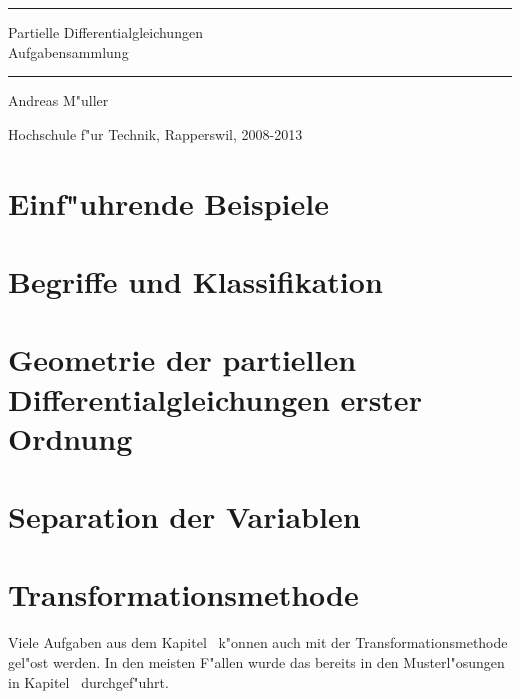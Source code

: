 \documentclass[a4paper,12pt]{book}
\begin{document}
\pagestyle{fancy}
\rhead{}
\frontmatter
\newcommand\HRule{\noindent\rule{\linewidth}{1.5pt}}
\begin{titlepage}
\HRule
\vspace*{2pt}
\begin{flushright}
{\Huge
Partielle Differentialgleichungen\\
\bigskip
Aufgabensammlung}
\end{flushright}
\HRule
\begin{flushright}
\vspace{30pt}
\LARGE
Andreas M"uller
\end{flushright}
\begin{center}
Hochschule f"ur Technik, Rapperswil, 2008-2013
\end{center}
\end{titlepage}
\hypersetup{
	colorlinks=true,
	linktoc=all,
	linkcolor=blue
}
\tableofcontents
\newenvironment{beispiel}[1][Beispiel]{%
\begin{proof}[#1]%
\renewcommand{\qedsymbol}{$\bigcirc$}
}{\end{proof}}
\mainmatter


\chapter{Einf"uhrende  Beispiele}

\chapter{Begriffe und Klassifikation}

\chapter{Geometrie der partiellen Differentialgleichungen erster Ordnung}

\chapter{Separation der Variablen\label{chapter:separation}}

\chapter{Transformationsmethode}
Viele Aufgaben aus dem Kapitel~\label{chapter:separation}
k"onnen auch mit der Transformationsmethode gel"ost werden.
In den meisten F"allen wurde das bereits in den Musterl"osungen in
Kapitel~\label{chapter:separation} durchgef"uhrt.
\bigskip
\end{document}
